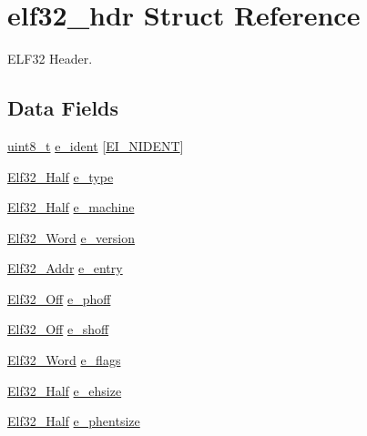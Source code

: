 \hypertarget{structelf32__hdr}{\section{elf32\+\_\+hdr Struct Reference}
\label{structelf32__hdr}
}


E\+L\+F32 Header.  


\subsection*{Data Fields}
\begin{DoxyCompactItemize}
\item 
\hyperlink{aplus_8h_ae0430369c5a35dcdbc0bc19dcbb33a03}{uint8\+\_\+t} \hyperlink{structelf32__hdr_a47cad02c87b35eab4d8fda5f3f0fefd4}{e\+\_\+ident} \mbox{[}\hyperlink{exec_8c_ae407130db14180c6737390604ba7c1fe}{E\+I\+\_\+\+N\+I\+D\+E\+N\+T}\mbox{]}
\item 
\hyperlink{exec_8c_a2ff0787d7d1bae0f251192806a2974ca}{Elf32\+\_\+\+Half} \hyperlink{structelf32__hdr_a01aab87d9a8f658d41a1162158c07878}{e\+\_\+type}
\item 
\hyperlink{exec_8c_a2ff0787d7d1bae0f251192806a2974ca}{Elf32\+\_\+\+Half} \hyperlink{structelf32__hdr_ac683164e0380f6babe3f46a3a1ffdfe9}{e\+\_\+machine}
\item 
\hyperlink{exec_8c_af5924ece606c732e86f8263a19408e45}{Elf32\+\_\+\+Word} \hyperlink{structelf32__hdr_a4324ae029dfd1967979b984a2f3e14e4}{e\+\_\+version}
\item 
\hyperlink{exec_8c_a40c6d4571e6001f443cc6a6474620158}{Elf32\+\_\+\+Addr} \hyperlink{structelf32__hdr_aebf266c7454956ac9aca091c837f6c14}{e\+\_\+entry}
\item 
\hyperlink{exec_8c_a655751f9b317369b93c581ea8ed84516}{Elf32\+\_\+\+Off} \hyperlink{structelf32__hdr_a88337612d820200d75185c304124ad24}{e\+\_\+phoff}
\item 
\hyperlink{exec_8c_a655751f9b317369b93c581ea8ed84516}{Elf32\+\_\+\+Off} \hyperlink{structelf32__hdr_afd8ce4ec0f05960b2306f98625be6db0}{e\+\_\+shoff}
\item 
\hyperlink{exec_8c_af5924ece606c732e86f8263a19408e45}{Elf32\+\_\+\+Word} \hyperlink{structelf32__hdr_a8695845266a8825d6cc9c04205c783f5}{e\+\_\+flags}
\item 
\hyperlink{exec_8c_a2ff0787d7d1bae0f251192806a2974ca}{Elf32\+\_\+\+Half} \hyperlink{structelf32__hdr_a3d3364b74b882c7383f11a17ddda34b2}{e\+\_\+ehsize}
\item 
\hyperlink{exec_8c_a2ff0787d7d1bae0f251192806a2974ca}{Elf32\+\_\+\+Half} \hyperlink{structelf32__hdr_a7c8f7ea4bb2789905be6dc875c1e502d}{e\+\_\+phentsize}

\end{DoxyCompactItemize}

